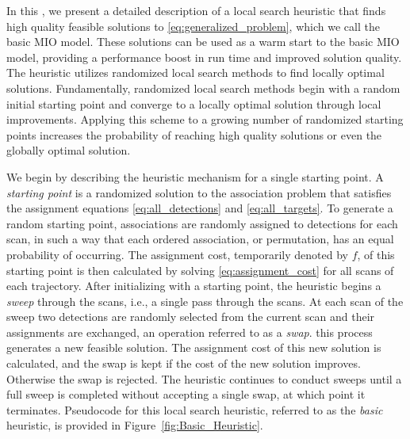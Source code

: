 In this \mytitle, we present a detailed description of a local search heuristic that finds high quality feasible solutions to \eqref{eq:generalized_problem}, which we call the basic MIO model. These solutions can be used as a warm start to the basic MIO model, providing a performance boost in run time and improved solution quality. The heuristic utilizes randomized local search methods to find locally optimal solutions. Fundamentally, randomized local search methods begin with a random initial starting point and converge to a locally optimal solution through local improvements. Applying this scheme to a growing number of randomized starting points increases the probability of reaching high quality solutions or even the globally optimal solution.

We begin by describing the heuristic mechanism for a single starting point. A \textit{starting point} is a randomized solution to the association problem that satisfies the assignment equations \eqref{eq:all_detections} and \eqref{eq:all_targets}. To generate a random starting point, associations are randomly assigned to detections for each scan, in such a way that each ordered association, or permutation, has an equal probability of occurring. The assignment cost, temporarily denoted by $f$, of this starting point is then calculated by solving \eqref{eq:assignment_cost} for all scans of each trajectory. After initializing with a starting point, the heuristic begins a \textit{sweep} through the scans, i.e., a single pass through the scans. At each scan of the sweep two detections are randomly selected from the current scan and their assignments are exchanged, an operation referred to as a \textit{swap}. this process generates a new feasible solution. The assignment cost of this new solution is calculated, and the swap is kept if the cost of the new solution improves. Otherwise the swap is rejected. The heuristic continues to conduct sweeps until a full sweep is completed without accepting a single swap, at which point it terminates. Pseudocode for this local search heuristic, referred to as the \textit{basic} heuristic, is provided in Figure~\ref{fig:Basic_Heuristic}.
